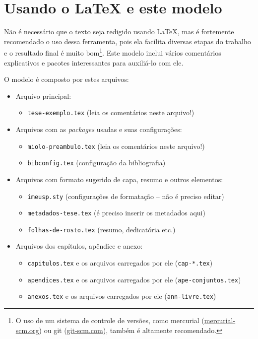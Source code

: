 \chapter{Usando o \LaTeX{} e este modelo}

Não é necessário que o texto seja redigido usando \LaTeX{}, mas é fortemente
recomendado o uso dessa ferramenta, pois ela facilita diversas etapas do
trabalho e o resultado final é muito bom\footnote{O uso de um sistema de
controle de versões, como mercurial (\url{mercurial-scm.org}) ou git
(\url{git-scm.com}), também é altamente recomendado.}. Este modelo inclui
vários comentários explicativos e pacotes interessantes para auxiliá-lo com
ele.

O modelo é composto por estes arquivos:

\begin{itemize}
  \item Arquivo principal:
  \begin{itemize}
    \item \texttt{tese-exemplo.tex} (leia os comentários neste arquivo!)
  \end{itemize}

  \item Arquivos com as \textit{packages} usadas e suas configurações:
  \begin{itemize}
    \item \texttt{miolo-preambulo.tex} (leia os comentários neste arquivo!)
    \item \texttt{bibconfig.tex} (configuração da bibliografia)
  \end{itemize}

  \item Arquivos com formato sugerido de capa, resumo e outros elementos:
  \begin{itemize}
    \item \texttt{imeusp.sty} (configurações de formatação -- não é preciso editar)
    \item \texttt{metadados-tese.tex} (é preciso inserir os metadados aqui)
    \item \texttt{folhas-de-rosto.tex} (resumo, dedicatória etc.)
  \end{itemize}

  \item Arquivos dos capítulos, apêndice e anexo:
  \begin{itemize}
    \item \texttt{capitulos.tex} e os arquivos carregados por ele (\texttt{cap-*.tex})
    \item \texttt{apendices.tex} e os arquivos carregados por ele (\texttt{ape-conjuntos.tex})
    \item \texttt{anexos.tex} e os arquivos carregados por ele (\texttt{ann-livre.tex})
  \end{itemize}


\end{itemize}
